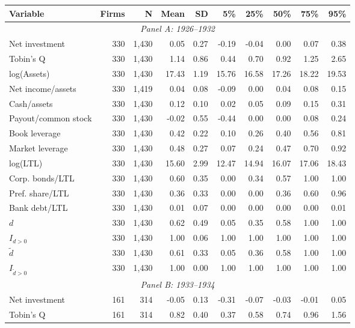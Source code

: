 \begin{threeparttable}
\begin{tabular}{lrrrrrrrrr}
\toprule
Variable & Firms & N & Mean & SD & 5\% & 25\% & 50\% & 75\% & 95\% \\
\midrule
\multicolumn{10}{c}{\textit{Panel A: 1926--1932}} \\
\midrule
Net investment & 330 & 1,430 & 0.05 & 0.27 & -0.19 & -0.04 & 0.00 & 0.07 & 0.38 \\
Tobin's Q & 330 & 1,430 & 1.14 & 0.86 & 0.44 & 0.70 & 0.92 & 1.25 & 2.65 \\
log(Assets) & 330 & 1,430 & 17.43 & 1.19 & 15.76 & 16.58 & 17.26 & 18.22 & 19.53 \\
Net income/assets & 330 & 1,419 & 0.04 & 0.08 & -0.09 & 0.00 & 0.04 & 0.08 & 0.15 \\
Cash/assets & 330 & 1,430 & 0.12 & 0.10 & 0.02 & 0.05 & 0.09 & 0.15 & 0.31 \\
Payout/common stock & 330 & 1,430 & -0.02 & 0.55 & -0.44 & 0.00 & 0.00 & 0.08 & 0.24 \\
Book leverage & 330 & 1,430 & 0.42 & 0.22 & 0.10 & 0.26 & 0.40 & 0.56 & 0.81 \\
Market leverage & 330 & 1,430 & 0.48 & 0.27 & 0.07 & 0.24 & 0.47 & 0.70 & 0.92 \\
log(LTL) & 330 & 1,430 & 15.60 & 2.99 & 12.47 & 14.94 & 16.07 & 17.06 & 18.43 \\
Corp. bonds/LTL & 330 & 1,430 & 0.60 & 0.35 & 0.00 & 0.34 & 0.57 & 1.00 & 1.00 \\
Pref. share/LTL & 330 & 1,430 & 0.36 & 0.33 & 0.00 & 0.00 & 0.36 & 0.60 & 0.96 \\
Bank debt/LTL & 330 & 1,430 & 0.01 & 0.07 & 0.00 & 0.00 & 0.00 & 0.00 & 0.01 \\
\ensuremath{d} & 330 & 1,430 & 0.62 & 0.49 & 0.05 & 0.35 & 0.58 & 1.00 & 1.00 \\
\ensuremath{I_{d>0}} & 330 & 1,430 & 1.00 & 0.06 & 1.00 & 1.00 & 1.00 & 1.00 & 1.00 \\
\ensuremath{\tilde{d}} & 330 & 1,430 & 0.61 & 0.33 & 0.05 & 0.36 & 0.58 & 1.00 & 1.00 \\
\ensuremath{I_{\tilde{d}>0}} & 330 & 1,430 & 1.00 & 0.00 & 1.00 & 1.00 & 1.00 & 1.00 & 1.00 \\
\midrule
\multicolumn{10}{c}{\textit{Panel B: 1933--1934}} \\
\midrule
Net investment & 161 & 314 & -0.05 & 0.13 & -0.31 & -0.07 & -0.03 & -0.01 & 0.05 \\
Tobin's Q & 161 & 314 & 0.82 & 0.40 & 0.37 & 0.58 & 0.74 & 0.96 & 1.56 \\

\end{tabular}
\end{threeparttable}
